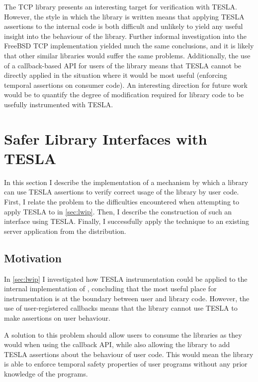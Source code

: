 The \lwip{} TCP library presents an interesting target for verification with TESLA.
However, the style in which the library is written means that applying TESLA
assertions to the internal code is both difficult and unlikely to yield any
useful insight into the behaviour of the library. Further informal investigation
into the FreeBSD TCP implementation yielded much the same conclusions, and it is
likely that other similar libraries would suffer the same problems.
Additionally, the use of a callback-based API for users of the library means
that TESLA cannot be directly applied in the situation where it would be most
useful (enforcing temporal assertions on consumer code). An interesting
direction for future work would be to quantify the degree of modification
required for library code to be usefully instrumented with TESLA.

\section{Safer Library Interfaces with TESLA} \label{sec:safer-libs}

In this section I describe the implementation of a mechanism by which a library
can use TESLA assertions to verify correct usage of the library by user code.
First, I relate the problem to the difficulties encountered when attempting to
apply TESLA to \lwip{} in \autoref{sec:lwip}. Then, I describe the construction of
such an interface using TESLA. Finally, I successfully apply the technique to an
existing server application from the \lwip{} distribution.

\subsection{Motivation}

In \autoref{sec:lwip} I investigated how TESLA instrumentation could be applied
to the internal implementation of \lwip{}, concluding that the most useful place
for instrumentation is at the boundary between user and library code.  However,
the use of user-registered callbacks means that the library cannot use TESLA to
make assertions on user behaviour.

A solution to this problem should allow users to consume the \lwip{} libraries as
they would when using the callback API, while also allowing the library to add
TESLA assertions about the behaviour of user code. This would mean the library
is able to enforce temporal safety properties of user programs without any prior
knowledge of the programs.

